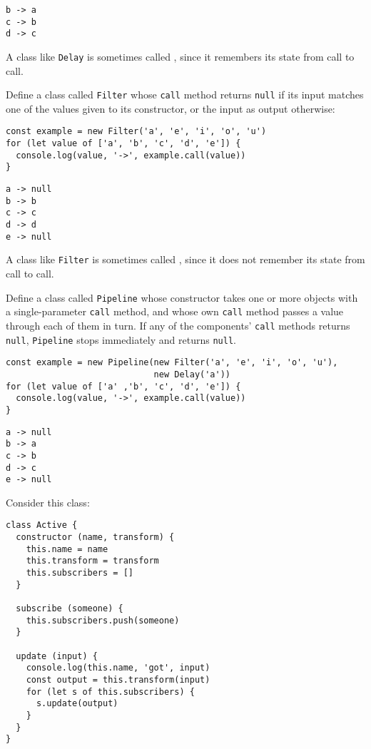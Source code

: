 \begin{verbatim}
b -> a
c -> b
d -> c
\end{verbatim}

A class like \texttt{Delay} is sometimes called ,
since it remembers its state from call to call.


Define a class called \texttt{Filter} whose \texttt{call} method returns \texttt{null}
if its input matches one of the values given to its constructor,
or the input as output otherwise:

\begin{verbatim}
const example = new Filter('a', 'e', 'i', 'o', 'u')
for (let value of ['a', 'b', 'c', 'd', 'e']) {
  console.log(value, '->', example.call(value))
}
\end{verbatim}

\begin{verbatim}
a -> null
b -> b
c -> c
d -> d
e -> null
\end{verbatim}

A class like \texttt{Filter} is sometimes called ,
since it does not remember its state from call to call.


Define a class called \texttt{Pipeline}
whose constructor takes one or more objects with a single-parameter \texttt{call} method,
and whose own \texttt{call} method passes a value through each of them in turn.
If any of the components' \texttt{call} methods returns \texttt{null},
\texttt{Pipeline} stops immediately and returns \texttt{null}.

\begin{verbatim}
const example = new Pipeline(new Filter('a', 'e', 'i', 'o', 'u'),
                             new Delay('a'))
for (let value of ['a' ,'b', 'c', 'd', 'e']) {
  console.log(value, '->', example.call(value))
}
\end{verbatim}

\begin{verbatim}
a -> null
b -> a
c -> b
d -> c
e -> null
\end{verbatim}


Consider this class:

\begin{verbatim}
class Active {
  constructor (name, transform) {
    this.name = name
    this.transform = transform
    this.subscribers = []
  }

  subscribe (someone) {
    this.subscribers.push(someone)
  }

  update (input) {
    console.log(this.name, 'got', input)
    const output = this.transform(input)
    for (let s of this.subscribers) {
      s.update(output)
    }
  }
}
\end{verbatim}

